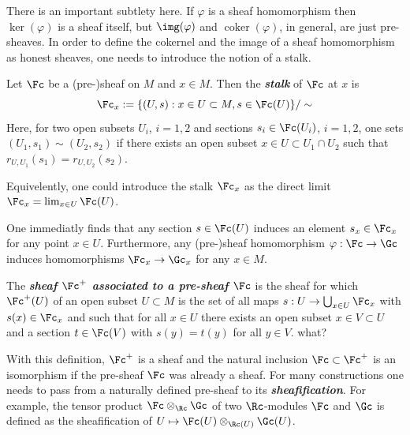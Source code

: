There is an important subtlety here. If $\varphi$ is a sheaf homomorphism then $\ker(\varphi)$ is a sheaf itself, but $\img(\varphi)$ and $\operatorname{coker}(\varphi)$, in general, are just pre-sheaves. In order to define the cokernel and the image of a sheaf homomorphism as honest sheaves, one needs to introduce the notion of a stalk.
\begin{defn}
	Let $\Fc$ be a (pre-)sheaf on $M$ and $x\in M$. Then the \textbf{\textit{stalk}} of $\Fc$ at $x$ is
	\[\Fc_x:=\{(U,s):x\in U\subset M,s\in\Fc(U)\}/\sim\]
	Here, for two open subsets $U_i$, $i=1,2$ and sections $s_i\in\Fc(U_i)$, $i=1,2$, one sets $(U_1,s_1)\sim(U_2,s_2)$ if there exists an open subset $x\in U\subset U_1\cap U_2$ such that $r_{U,U_1}(s_1)=r_{U,U_2}(s_2)$.
	
	Equivelently, one could introduce the stalk $\Fc_x$ as the direct limit $\Fc_x=\lim_{x\in U}\Fc(U)$.
\end{defn}
\begin{remark}
	One immediatly finds that any section $s\in\Fc(U)$ induces an element $s_x\in\Fc_x$ for any point $x\in U$. Furthermore, any (pre-)sheaf homomorphism $\varphi:\Fc\to\Gc$ induces homomorphisms $\Fc_x\to\Gc_x$ for any $x\in M$.
\end{remark}
\begin{defn}
	The \textbf{\textit{sheaf $\Fc^+$ associated to a pre-sheaf $\Fc$}} is the sheaf for which $\Fc^+(U)$ of an open subset $U\subset M$ is the set of all maps $s:U\to\bigcup_{x\in U}\Fc_x$ with $s(x)\in\Fc_x$ and such that for all $x\in U$ there exists an open subset $x\in V\subset U$ and a section $t\in\Fc(V)$ with $s(y)=t(y)$ for all $y\in V$. {\color{magenta}what?}
\end{defn}
\begin{remark}
	With this definition, $\Fc^+$ is a sheaf and the natural inclusion $\Fc\subset\Fc^+$ is an isomorphism if the pre-sheaf $\Fc$ was already a sheaf. For many constructions one needs to pass from a naturally defined pre-sheaf to its \textbf{\textit{sheafification}}. For example, the tensor product $\Fc\otimes_{\Rc}\Gc$ of two $\Rc$-modules $\Fc$ and $\Gc$ is defined as the sheafification of $U\mapsto\Fc(U)\otimes_{\Rc(U)}\Gc(U)$.
\end{remark}

